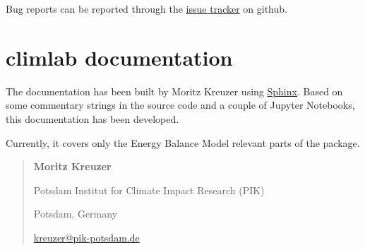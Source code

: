 \documentclass[a4paper,10pt,english]{sphinxmanual}
\begin{document}
Bug reports can be reported through the \href{https://github.com/brian-rose/climlab/issues}{issue tracker} on github.


\section{climlab documentation}
\label{contact:climlab-documentation}
The documentation has been built by Moritz Kreuzer using \href{http://www.sphinx-doc.org}{Sphinx}.
Based on some commentary strings in the source code and a couple of Jupyter Notebooks, this documentation has been developed.

Currently, it covers only the Energy Balance Model relevant parts of the package.
\begin{quote}

\begin{DUlineblock}{0em}
\item[] \textbf{Moritz Kreuzer}
\item[] Potsdam Institut for Climate Impact Research (PIK)
\item[] Potsdam, Germany
\item[] \href{mailto:kreuzer@pik-potsdam.de}{kreuzer@pik-potsdam.de}
\end{DUlineblock}
\end{quote}



\renewcommand{\indexname}{Index}
\end{document}
